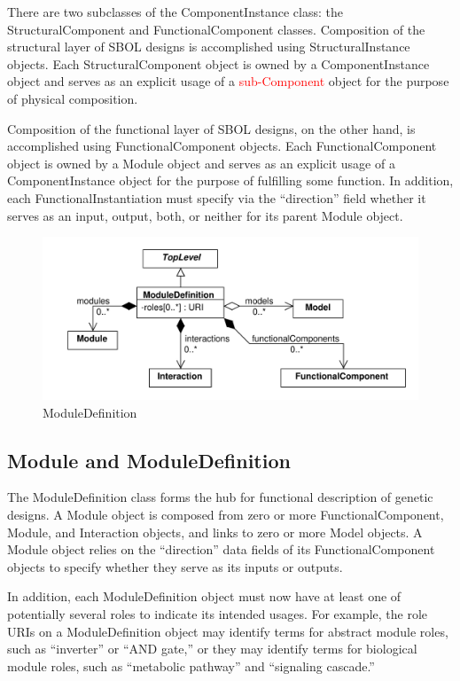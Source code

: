 \documentclass[draftspec]{sbmlpkgspec}
\begin{document}
There are two subclasses of the ComponentInstance class: the StructuralComponent and FunctionalComponent classes. Composition of the structural layer of SBOL designs is accomplished using StructuralInstance objects. Each StructuralComponent object is owned by a ComponentInstance object and serves as an explicit usage of a \textcolor{red}{sub-Component} object for the purpose of physical composition.

Composition of the functional layer of SBOL designs, on the other hand, is accomplished using FunctionalComponent objects. Each FunctionalComponent object is owned by a Module object and serves as an explicit usage of a ComponentInstance object for the purpose of fulfilling some function. In addition, each FunctionalInstantiation must specify via the “direction” field whether it serves as an  input, output, both, or neither for its parent Module object. 

\begin{figure}[h]
\begin{center}
\includegraphics[width=\textwidth]{uml/module_definition}
\caption[]{ModuleDefinition}
\label{uml:module_definition}
\end{center}
\end{figure}

\subsection{Module and ModuleDefinition}

The ModuleDefinition class forms the hub for functional description of genetic designs. A Module object is composed from zero or more FunctionalComponent, Module, and Interaction objects, and links to zero or more Model objects. A Module object relies on the “direction” data fields of its FunctionalComponent objects to specify whether they serve as its inputs or outputs.

In addition, each ModuleDefinition object must now have at least one of potentially several roles to indicate its intended usages. For example, the role URIs on a ModuleDefinition object may identify terms for abstract module roles, such as “inverter” or “AND gate,” or they may identify terms for biological module roles, such as “metabolic pathway” and “signaling cascade.”
\end{document}
